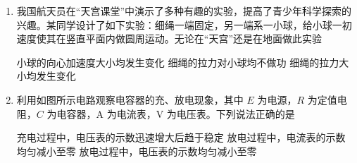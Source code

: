 \documentclass[\gkver]{gaokaozhenti}
\begin{document}
\begin{enumerate}
{B．电子在云室中运行，洛伦兹力不做功，而粒子受到云室内填充物质的阻力作用，粒子速度越来越小，B 错误；

C．带电粒子若仅在洛伦兹力的作用下做匀速圆周运动，根据牛顿第二定律可知 $qvB = m\frac{v^{2}}{r}$，解得粒子运动的半径为 $r = \frac{mv}{qB}$，根据题图可知轨迹 3 对应的粒子运动的半径更大，速度更大，粒子运动过程中受到云室内物质的阻力的情况下，此结论也成立，C 错误。

故选 A。
}

\item
我国航天员在“天宫课堂”中演示了多种有趣的实验，提高了青少年科学探索的兴趣。某同学设计了如下实验：细绳一端固定，另一端系一小球，给小球一初速度使其在竖直平面内做圆周运动。无论在“天宫”还是在地面做此实验


{小球的向心加速度大小均发生变化}
{细绳的拉力对小球均不做功}
{细绳的拉力大小均发生变化}


\item
利用如图所示电路观察电容器的充、放电现象，其中 $E$ 为电源，$R$ 为定值电阻，$C$ 为电容器，A 为电流表，V 为电压表。下列说法正确的是


{充电过程中，电压表的示数迅速增大后趋于稳定}
{放电过程中，电流表的示数均匀减小至零}
{放电过程中，电压表的示数均匀减小至零}

\end{enumerate}
\end{document}
